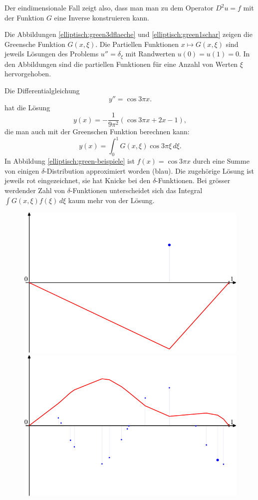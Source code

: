 Der eindimensionale Fall zeigt also, dass man man zu dem Operator $D^2u=f$
mit der Funktion $G$ eine Inverse konstruieren kann.

Die Abbildungen \ref{elliptisch:green3dflaeche} und
\ref{elliptisch:green1schar} zeigen die Greensche Funktion $G(x,\xi)$.
Die Partiellen Funktionen $x\mapsto G(x,\xi)$ sind jeweils Lösungen
des Problems $u''=\delta_\xi$ mit Randwerten $u(0)=u(1)=0$.
In den Abbildungen sind die partiellen Funktionen für eine Anzahl
von Werten $\xi$ hervorgehoben.

\begin{beispiel}
Die Differentialgleichung
\[
y''=\cos 3\pi x.
\]
hat die Lösung
\[
y(x)=-\frac1{9\pi^2}(\cos 3\pi x + 2x - 1),
\]
die man auch mit der Greenschen Funktion berechnen kann:
\[
y(x)=\int_0^1 G(x,\xi)\cos 3\pi\xi\,d\xi.
\]
In Abbildung
\ref{elliptisch:green-beispiele}
ist $f(x)=\cos 3\pi x$ durch eine Summe von einigen $\delta$-Distribution
approximiert worden (blau).
Die zugehörige Lösung ist jeweils rot eingezeichnet, sie hat
Knicke bei den $\delta$-Funktionen. 
Bei grösser werdender Zahl von $\delta$-Funktionen unterscheidet sich
das Integral $\int G(x,\xi)f(\xi)\,d\xi$ kaum mehr von der Lösung.
\begin{figure}
\begin{center}
\includegraphics[width=0.7\hsize]{../common/graphics/green-1.pdf}\\
\includegraphics[width=0.7\hsize]{../common/graphics/green-324.pdf}\\

\end{center}
\end{figure}
\end{beispiel}
